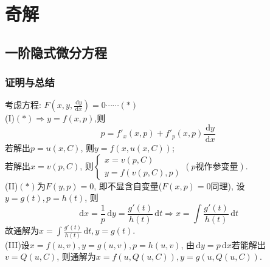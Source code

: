 \documentclass[titlepage,11pt,a4paper,twoside]{report}
\newcommand\diff{\,\mathrm{d}}
\begin{document}
\chapter{奇解}
\section{一阶隐式微分方程}
\subsection{证明与总结}
考虑方程: $F\left(x,y,\frac{\diff y}{\diff x}\right)=0\cdots\cdots(*)$\\
(I)$(*)\Rightarrow y=f(x,p)$,则
\[p=f'_x(x,p)+f'_p(x,p)\frac{\diff y}{\diff x}\]
若解出$p=u(x,C)$, 则$y=f(x,u(x,C))$;\\
若解出$x=v(p,C)$, 则$\begin{cases}
x=v(p,C)\\y=f(v(p,C),p)
\end{cases}(p视作参变量)$.\\
(II)$(*)$为$F(y,p)=0$, 即不显含自变量($F(x,p)=0$同理), 设$y=g(t),p=h(t)$, 则
\[\diff x=\frac{1}{p}\diff y=\frac{g'(t)}{h(t)}\diff t\Rightarrow x=\int\frac{g'(t)}{h(t)}\diff t\]
故通解为$x=\int\frac{g'(t)}{h(t)}\diff t,y=g(t).$\\
(III)设$x=f(u,v),y=g(u,v),p=h(u,v)$, 由$\diff y=p\diff x$若能解出$v=Q(u,C)$, 则通解为$x=f(u,Q(u,C)),y=g(u,Q(u,C))$.
\end{document}
